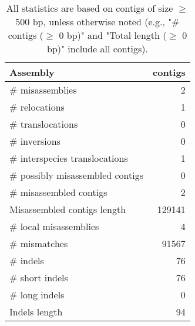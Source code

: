 \documentclass[12pt,a4paper]{article}
\begin{document}
\begin{table}[ht]
\begin{center}
\caption{All statistics are based on contigs of size $\geq$ 500 bp, unless otherwise noted (e.g., "\# contigs ($\geq$ 0 bp)" and "Total length ($\geq$ 0 bp)" include all contigs).}
\begin{tabular}{|l*{1}{|r}|}
\hline
Assembly & contigs \\ \hline
\# misassemblies & 2 \\ \hline
\hspace{5mm}\# relocations & 1 \\ \hline
\hspace{5mm}\# translocations & 0 \\ \hline
\hspace{5mm}\# inversions & 0 \\ \hline
\hspace{5mm}\# interspecies translocations & 1 \\ \hline
\# possibly misassembled contigs & 0 \\ \hline
\# misassembled contigs & 2 \\ \hline
Misassembled contigs length & 129141 \\ \hline
\# local misassemblies & 4 \\ \hline
\# mismatches & 91567 \\ \hline
\# indels & 76 \\ \hline
\hspace{5mm}\# short indels & 76 \\ \hline
\hspace{5mm}\# long indels & 0 \\ \hline
Indels length & 94 \\ \hline
\end{tabular}
\end{center}
\end{table}
\end{document}
